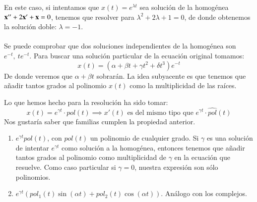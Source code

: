\begin{eg}[Ecuación lineal de orden 2: $\mbf{x}''+3\mbf{x}'+\mbf{x}=te^{-t}$]\label{eg:lin-ii-pol}
    En este caso, si intentamos que $x(t) = e^{\lambda t}$ sea solución de la homogénea $\mathbf{x}'' + 2\mathbf{x}' + \mathbf{x} = 0$, tenemos que resolver para $\lambda^2 + 2\lambda + 1 = 0$, de donde obtenemos la solución doble: $\lambda = -1$.\\\\
    Se puede comprobar que dos soluciones independientes de la homogénea son $e^{-t},\ te^{-t}$. Para buscar una solución particular de la ecuación original tomamos:
    $$
        x(t) = (\alpha + \beta t + \gamma t^2 + \delta t^3) e^{-t}
    $$
    De donde veremos que $\alpha + \beta t$ sobrarán. La idea subyacente es que tenemos que añadir tantos grados al polinomio $x(t)$ como la multiplicidad de las raíces.
\end{eg}
\begin{obs}\label{obs:lin-ii-pol}
    Lo que hemos hecho para la resolución ha sido tomar:
    $$
        x(t) = e^{\gamma t} \cdot pol(t) \implies x'(t) \text{ es del mismo tipo que } e^{\gamma t} \cdot \hat{pol}(t)
    $$
    Nos gustaría saber que familias cumplen la propiedad anterior.
    \begin{enumerate}
        \item $e^{\gamma t} pol(t)$, con $pol(t)$ un polinomio de cualquier grado. Si $\gamma$ es una solución de intentar $e^{\gamma t}$ como solución a la homogénea, entonces tenemos que añadir tantos grados al polinomio como multiplicidad de $\gamma$ en la ecuación que resuelve. Como caso particular si $\gamma = 0$, nuestra expresión son sólo polinomios.
        \item $e^{\gamma t} (pol_1(t) \sin(\alpha t) + pol_2(t)\cos(\alpha t))$. Análogo con los complejos. %
    \end{enumerate}
\end{obs}



